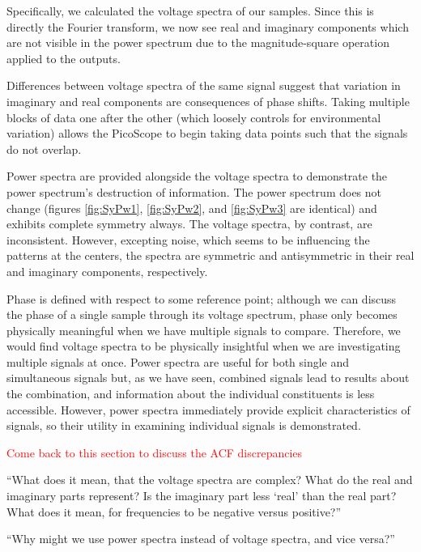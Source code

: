 \documentclass[a4paper]{article}
\begin{document}
Specifically, we calculated the voltage spectra of our samples. Since this is directly the Fourier transform, we now see real and imaginary components which are not visible in the power spectrum due to the magnitude-square operation applied to the outputs.

Differences between voltage spectra of the same signal suggest that variation in imaginary and real components are consequences of phase shifts. Taking multiple blocks of data one after the other (which loosely controls for environmental variation) allows the PicoScope to begin taking data points such that the signals do not overlap.

Power spectra are provided alongside the voltage spectra to demonstrate the power spectrum's destruction of information. The power spectrum does not change (figures \ref{fig:SyPw1}, \ref{fig:SyPw2}, and \ref{fig:SyPw3} are identical) and exhibits complete symmetry always. The voltage spectra, by contrast, are inconsistent. However, excepting noise, which seems to be influencing the patterns at the centers, the spectra are symmetric and antisymmetric in their real and imaginary components, respectively.


Phase is defined with respect to some reference point; although we can discuss the phase of a single sample through its voltage spectrum, phase only becomes physically meaningful when we have multiple signals to compare. Therefore, we would find voltage spectra to be physically insightful when we are investigating multiple signals at once. Power spectra are useful for both single and simultaneous signals but, as we have seen, combined signals lead to results about the combination, and information about the individual constituents is less accessible. However, power spectra immediately provide explicit characteristics of signals, so their utility in examining individual signals is demonstrated.


\textcolor{red}{Come back to this section to discuss the ACF discrepancies}

``What does it mean, that the voltage spectra are complex? What do the real and imaginary
parts represent? Is the imaginary part less ‘real’ than the real part? What does it mean, for
frequencies to be negative versus positive?''

``Why might we use power spectra instead of voltage spectra, and vice versa?''
\end{document}
